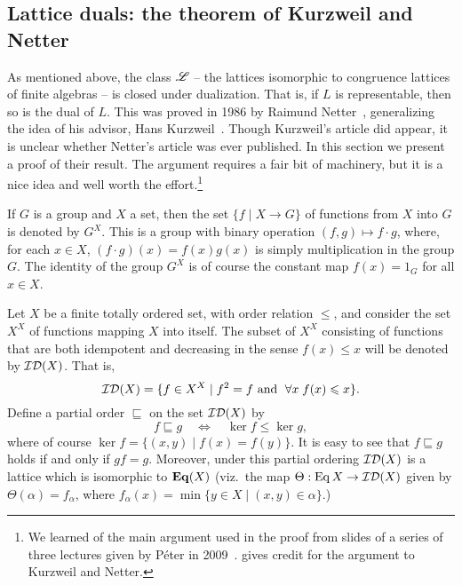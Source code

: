 \subsection{Lattice duals: the theorem of Kurzweil and Netter}
\label{sec:duals-interv-subl-detail}
As mentioned above, 
the class $\mathscr{L}$ -- the lattices isomorphic to congruence lattices of finite
algebras -- is closed under
dualization.
That is, if $L$ is representable, then so is the dual of $L$. This was proved in
1986 by Raimund Netter~\cite{Netter:1986}, generalizing the idea of his advisor,
Hans Kurzweil~\cite{Kurzweil:1985}. 
Though Kurzweil's article did appear,
it is unclear whether Netter's
article was ever published.
In this section we present a proof of their result.
The argument requires a fair bit of machinery, but it is a nice idea and
well worth the effort.\footnote{We learned 
  of the main argument used in the proof from slides of a series of three
  lectures given by P{\'e}ter \Palfy in 2009~\cite{Palfy:2009}.
  \Palfy gives credit for the argument to Kurzweil and Netter.} 

If $G$ is a group and $X$ a set, then the set $\{f \mid X\rightarrow G\}$ of 
functions from $X$ into $G$ is denoted by $G^X$.  This is a group with binary
operation $(f,g) \mapsto f\cdot g$, where,  
for each $x\in X$, $(f\cdot g)(x)= f(x)g(x)$ is simply multiplication
in the group $G$.  The identity of the group $G^X$ is of course the constant map $f(x) =
1_G$ for all $x\in X$.

Let $X$ be a finite totally ordered set, with order relation $\leq$,
and consider the set $X^X$ of functions mapping $X$ into itself.  
The subset of $X^X$ consisting of functions that are both idempotent and
decreasing in the sense $f(x) \leq x$
will be denoted by $\mathcal{ID}(X)$.  That is,
\[
\mathcal{ID}(X) = \{f\in X^X \mid f^2 = f \text{ and }\; \forall x\; f(x) \leqslant x\}.
\]
Define a partial order $\sqsubseteq$ on the set $\mathcal{ID}(X)$ by
\begin{equation}
  \label{eq:MID111}
  f\sqsubseteq g \quad \Leftrightarrow \quad \ker f \leq \ker g,
\end{equation}
where of course $\ker f = \{(x,y) \mid f(x) = f(y)\}$.
It is easy to see that $f\sqsubseteq g$ holds if and only if $gf = g$.  
Moreover, under this partial ordering $\mathcal{ID}(X)$ is a lattice which is 
isomorphic to $\mathbf{Eq}(X)$ (viz.~the map $\Theta : \operatorname{Eq} X \rightarrow
\mathcal{ID}(X)$ given by $\Theta(\alpha) = f_\alpha$, where
$f_\alpha(x) = \min\{y\in X \mid (x,y)\in \alpha\}$.) %


